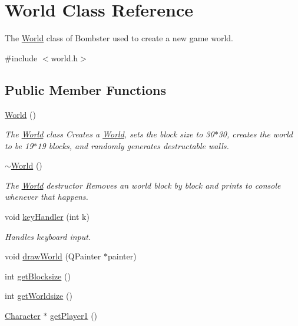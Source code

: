 \hypertarget{class_world}{\section{World Class Reference}
\label{class_world}
}


The \hyperlink{class_world}{World} class of Bombster used to create a new game world.  




{\ttfamily \#include $<$world.\-h$>$}

\subsection*{Public Member Functions}
\begin{DoxyCompactItemize}
\item 
\hyperlink{class_world_afa39d4e6f714a7a3691ac0c656f5e8a8}{World} ()
\begin{DoxyCompactList}\small\item\em The \hyperlink{class_world}{World} class Creates a \hyperlink{class_world}{World}, sets the block size to 30$\ast$30, creates the world to be 19$\ast$19 blocks, and randomly generates destructable walls. \end{DoxyCompactList}\item 
\hyperlink{class_world_a8c73fba541a5817fff65147ba47cd827}{$\sim$\-World} ()
\begin{DoxyCompactList}\small\item\em The \hyperlink{class_world}{World} destructor Removes an world block by block and prints to console whenever that happens. \end{DoxyCompactList}\item 
void \hyperlink{class_world_a83f49e35b8f8b33f14198e87b2fa7312}{key\-Handler} (int k)
\begin{DoxyCompactList}\small\item\em Handles keyboard input. \end{DoxyCompactList}\item 
void \hyperlink{class_world_a08d405bfe0cef56b06f731addeb22bcf}{draw\-World} (Q\-Painter $\ast$painter)
\item 
int \hyperlink{class_world_ab44648ec788ea8dfe063a1fce7f86026}{get\-Blocksize} ()
\item 
int \hyperlink{class_world_a43fe0009fa77b79202cd3ef7e8e7af5f}{get\-Worldsize} ()
\item 
\hyperlink{class_character}{Character} $\ast$ \hyperlink{class_world_accd8de11e5d40fd7cf0f5a71661157b2}{get\-Player1} ()

\end{DoxyCompactItemize}
